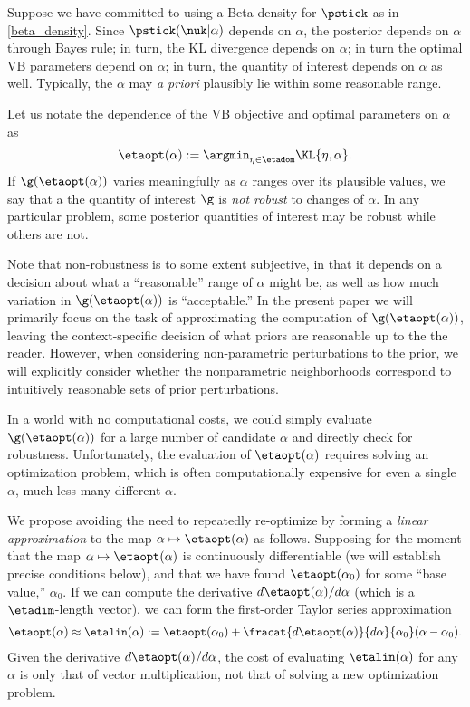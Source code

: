 Suppose we have committed to using a Beta density for $\pstick$ as in
\eqref{beta_density}. Since $\pstick(\nuk \vert \alpha)$ depends on $\alpha$,
the posterior depends on $\alpha$ through Bayes rule; in turn, the KL divergence
depends on $\alpha$; in turn the optimal VB parameters depend on $\alpha$; in
turn, the quantity of interest depends on $\alpha$ as well. Typically, the
$\alpha$ may {\em a priori} plausibly lie within some reasonable range.

Let us notate the dependence of the VB objective and optimal parameters on
$\alpha$ as
%
\begin{align*}
%
\etaopt(\alpha) := \argmin_{\eta \in \etadom} \KL{\eta, \alpha}.
%
\end{align*}
%
If $\g(\etaopt(\alpha))$ varies meaningfully as $\alpha$ ranges over its
plausible values, we say that a the quantity of interest $\g$ is {\em not
robust} to changes of $\alpha$.  In any particular problem, some posterior
quantities of interest may be robust while others are not.

Note that non-robustness is to some extent subjective, in that it depends on a
decision about what a ``reasonable'' range of $\alpha$ might be, as well as how
much variation in $\g(\etaopt(\alpha))$ is ``acceptable.''  In the present paper
we will primarily focus on the task of approximating the computation of
$\g(\etaopt(\alpha))$, leaving the context-specific decision of what priors are
reasonable up to the the reader.  However, when considering non-parametric
perturbations to the prior, we will explicitly consider whether the
nonparametric neighborhoods correspond to intuitively reasonable sets of prior
perturbations.

In a world with no computational costs, we could simply evaluate
$\g(\etaopt(\alpha))$ for a large number of candidate $\alpha$ and directly
check for robustness.  Unfortunately, the evaluation of $\etaopt(\alpha)$
requires solving an optimization problem, which is often computationally
expensive for even a single $\alpha$, much less many different $\alpha$.

We propose avoiding the need to repeatedly re-optimize by forming a {\em linear
approximation} to the map $\alpha \mapsto \etaopt(\alpha)$ as follows. Supposing
for the moment that the map $\alpha \mapsto \etaopt(\alpha)$ is continuously
differentiable (we will establish precise conditions below), and that we have
found $\etaopt(\alpha_0)$ for some ``base value,'' $\alpha_0$.  If we can
compute the derivative $d \etaopt(\alpha) / d\alpha$ (which is a
$\etadim$-length vector), we can form the first-order Taylor series
approximation
%
\begin{align*}
%
\etaopt(\alpha) \approx \etalin(\alpha) :={}
    \etaopt(\alpha_0) +
    \fracat{d \etaopt(\alpha)}{d\alpha}{\alpha_0} (\alpha - \alpha_0).
%
\end{align*}
%
Given the derivative $d \etaopt(\alpha) / d\alpha$, the cost of evaluating
$\etalin(\alpha)$ for any $\alpha$ is only that of vector multiplication, not
that of solving a new optimization problem.

